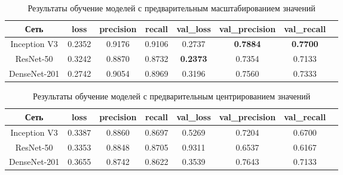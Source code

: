\begin{table}[H]
    \centering
    \caption{Результаты обучение моделей с предварительным масштабированием значений} \label{rescale}
    \begin{tabular}{|c|c|c|c|c|c|c|c|}
        \hline    
        Сеть          & loss   & precision & recall & val\_loss & val\_precision & val\_recall \\ %
        \hline
        Inception V3  & 0.2352 & 0.9176    & 0.9106 & 0.2737   & \textbf{0.7884}        & \textbf{0.7700} \\ %
        \hline
        ResNet-50     & 0.3242 & 0.8870    & 0.8732 & \textbf{0.2373}    & 0.7354         & 0.7133 \\ %
        \hline
        DenseNet-201  & 0.2742 & 0.9054    & 0.8969 & 0.3196    & 0.7560         & 0.7333 \\ %
        \hline
      \end{tabular}
\end{table}

\begin{table}[H]
    \centering
    \caption{Результаты обучение моделей с предварительным центрированием значений} \label{samplewise}    
    \begin{tabular}{|c|c|c|c|c|c|c|c|}
        \hline    
        Сеть          & loss   & precision & recall & val\_loss & val\_precision & val\_recall \\ %
        \hline
        Inception V3  & 0.3387 & 0.8860    & 0.8697 & 0.5269    & 0.7204         & 0.6700 \\ %
        \hline
        ResNet-50     & 0.3353  & 0.8848   & 0.8705 & 0.9311   & 0.6537        & 0.6167 \\ %
        \hline
        DenseNet-201  & 0.3655  & 0.8742   & 0.8622 & 0.3539   & 0.7643        & 0.7133 \\ %
        \hline
      \end{tabular}
\end{table}




